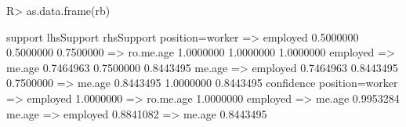 \begin{Schunk}
% --begin: "searchrules3"
\begin{Sinput}
R> as.data.frame(rb)
\end{Sinput}
\begin{Soutput}
                              support lhsSupport rhsSupport
position=worker => employed 0.5000000  0.5000000  0.7500000
 => ro.me.age               1.0000000  1.0000000  1.0000000
employed => me.age          0.7464963  0.7500000  0.8443495
me.age => employed          0.7464963  0.8443495  0.7500000
 => me.age                  0.8443495  1.0000000  0.8443495
                            confidence
position=worker => employed  1.0000000
 => ro.me.age                1.0000000
employed => me.age           0.9953284
me.age => employed           0.8841082
 => me.age                   0.8443495
\end{Soutput}
%
% --end: "searchrules3"
\end{Schunk}
